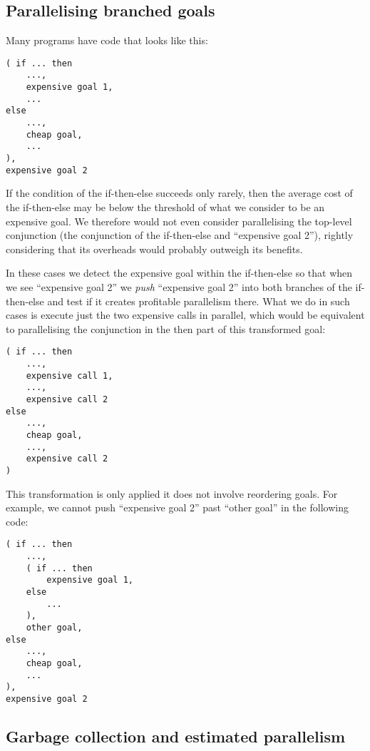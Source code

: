 
\subsection{Parallelising branched goals}
\label{sec:overlap_pragma_push}

Many programs have code that looks like this:
\begin{verbatim}
( if ... then
    ...,
    expensive goal 1,
    ...
else
    ...,
    cheap goal,
    ...
),
expensive goal 2
\end{verbatim}
If the condition of the if-then-else succeeds only rarely,
then the average cost of the if-then-else
may be below the threshold of what we consider to be an expensive goal.
We therefore would not even consider
parallelising the top-level conjunction
(the conjunction of the if-then-else and ``expensive goal 2''),
rightly considering that its overheads would probably outweigh its benefits.

In these cases we detect the expensive goal within the if-then-else
so that when we see ``expensive goal 2'' we \emph{push}
``expensive goal 2'' into both branches of the if-then-else and test if it
creates profitable parallelism there.
What we do in such cases
is execute just the two expensive calls in parallel,
which would be equivalent to parallelising the conjunction
in the then part of this transformed goal:
\begin{verbatim}
( if ... then
    ...,
    expensive call 1,
    ...,
    expensive call 2
else
    ...,
    cheap goal,
    ...,
    expensive call 2
)
\end{verbatim}

This transformation is only applied it does not involve reordering goals.
For example, we cannot push ``expensive goal 2'' past ``other goal'' in the
following code:

\begin{verbatim}
( if ... then
    ...,
    ( if ... then
        expensive goal 1,
    else
        ...
    ),
    other goal,
else
    ...,
    cheap goal,
    ...
),
expensive goal 2
\end{verbatim}

\subsection{Garbage collection and estimated parallelism}
\label{sec:overlap_pragma_gc}

